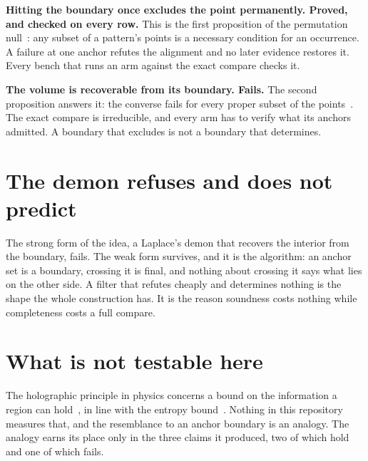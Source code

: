 \textbf{Hitting the boundary once excludes the point permanently. Proved, and checked on every row.}
This is the first proposition of the permutation null~\cite{src:Quigg-delta-null}: any subset of a
pattern's points is a necessary condition for an occurrence. A failure at one anchor refutes the
alignment and no later evidence restores it. Every bench that runs an arm against the exact compare
checks it.

\textbf{The volume is recoverable from its boundary. Fails.} The second proposition answers it: the
converse fails for every proper subset of the points~\cite{src:Quigg-delta-null}. The exact compare is
irreducible, and every arm has to verify what its anchors admitted. A boundary that excludes is not a
boundary that determines.

\section{The demon refuses and does not predict}

The strong form of the idea, a Laplace's demon that recovers the interior from the boundary, fails.
The weak form survives, and it is the algorithm: an anchor set is a boundary, crossing it is final, and
nothing about crossing it says what lies on the other side. A filter that refutes cheaply and
determines nothing is the shape the whole construction has. It is the reason soundness costs nothing
while completeness costs a full compare.

\section{What is not testable here}

The holographic principle in physics concerns a bound on the information a region can
hold~\cite{src:t-Hooft-1993,src:Susskind-1995}, in line with the entropy bound~\cite{src:Bekenstein-1981}.
Nothing in this repository measures that, and the resemblance to an anchor boundary is an analogy. The
analogy earns its place only in the three claims it produced, two of which hold and one of which
fails.
